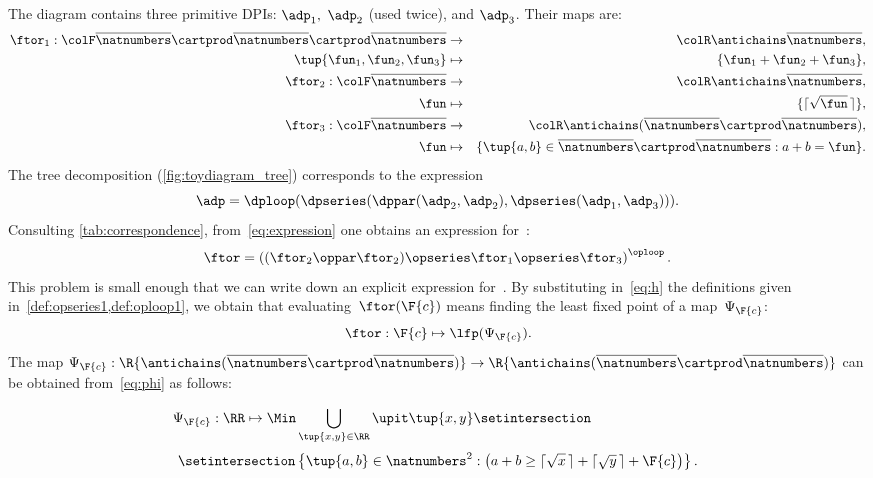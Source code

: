 The diagram contains three primitive DPIs: $\adp_{1},$ $\adp_{2}$ (used twice), and $\adp_{3}$.
Their \ftor maps are:
\begin{eqnarray*}
    \ftor_{1}:{\colF\overline{\natnumbers}\cartprod\overline{\natnumbers}\cartprod\overline{\natnumbers}} & \rightarrow & {\colR\antichains\overline{\natnumbers}},\\
    \tup{ \fun_{1},\fun_{2},\fun_{3}}  & \mapsto & \{\fun_{1}+\fun_{2}+\fun_{3}\},\\
    \ftor_{2}:{\colF\overline{\natnumbers}} & \rightarrow & {\colR\antichains\overline{\natnumbers}},\\
    \fun& \mapsto & \{\lceil\sqrt{\fun}\,\rceil\},\\
    \ftor_{3}:{\colF\overline{\natnumbers}} & \rightarrow & {\colR\antichains(\overline{\natnumbers}\cartprod\overline{\natnumbers})},\\
    \fun& \mapsto & \{\tup{ a,b} \in\overline{\natnumbers}\cartprod\overline{\natnumbers}:a+b=\fun\}.
\end{eqnarray*}
The tree decomposition (\cref{fig:toydiagram_tree}) corresponds to the expression
\begin{equation}
    \adp=\dploop(\dpseries(\dppar(\adp_{2},\adp_{2}),\dpseries(\adp_{1},\adp_{3}))).
    \label{eq:expression}
\end{equation}
Consulting \cref{tab:correspondence}, from~\cref{eq:expression} one obtains an expression for~\ftor:
\begin{equation}
    \ftor=\left((\ftor_{2}\oppar\ftor_{2})\opseries\ftor_{1}\opseries\ftor_{3}\right)^{\oploop}.
    \label{eq:h}
\end{equation}
This problem is small enough that we can write down an explicit expression for~\ftor.
By substituting in~\cref{eq:h} the definitions given in~\cref{def:opseries1,def:oploop1}, we obtain that evaluating~$\ftor(\F{c})$ means finding the least fixed point of a map~$\Psi_{\F{c}}$:
\begin{equation*}
    \ftor:\F{c}\mapsto\lfp(\Psi_{\F{c}}).
\end{equation*}
The map $\Psi_{\F{c}}:\R{\antichains(\overline{\natnumbers}\cartprod\overline{\natnumbers})}\rightarrow\R{\antichains(\overline{\natnumbers}\cartprod\overline{\natnumbers})}$ can be obtained from~\cref{eq:phi} as follows:

\begin{equation}
    \Psi_{\F{c}}:\RR\mapsto\Min\bigcup_{\tup{ x,y} \in\RR}\upit\tup{ x,y} \setintersection\qquad\qquad\qquad\qquad
\end{equation}
%
\begin{equation}
    \setintersection\left\{ \tup{ a,b} \in\natnumbers^{2}:\left(a+b\geq\lceil\sqrt{x}\,\rceil+\lceil\sqrt{y}\,\rceil+\F{c}\right)\right\}.
\end{equation}
%

